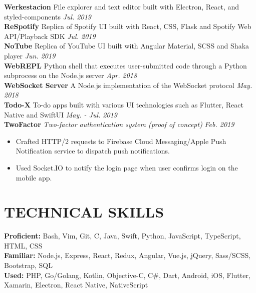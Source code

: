\documentclass[11pt]{article}
\begin{document}
\textbf{Werkestacion} \enspace File explorer and text editor built with Electron, React, and styled-components \hfill \textit{Jul. 2019}\\
\textbf{ReSpotify} \enspace Replica of Spotify UI built with React, CSS, Flask and Spotify Web API/Playback SDK \hfill\textit{Jul. 2019}\\
\textbf{NoTube} \enspace Replica of YouTube UI built with Angular Material, SCSS and Shaka player \hfill\textit{Jun. 2019}\\
%
\textbf{WebREPL}  \enspace Python shell that executes user-submitted code through a Python subprocess on the Node.js server \hfill\textit{Apr. 2018}\\
\textbf{WebSocket Server}  \enspace A Node.js implementation of the WebSocket protocol \hfill\textit{May. 2018}\\
\textbf{Todo-X} \enspace To-do apps built with various UI technologies such as Flutter, React Native and SwiftUI \hfill\textit{May. - Jul. 2019}\\
\textbf{TwoFactor} \enspace \textit{\color{gray} Two-factor authentication system (proof of concept)} \hfill \textit{Feb. 2019}
\begin{itemize}[leftmargin=15pt, noitemsep, topsep=0pt]
\item Crafted HTTP/2 requests to Firebase Cloud Messaging/Apple Push Notification service to dispatch push notifications.
\item Used Socket.IO to notify the login page when user confirms login on the mobile app.
\end{itemize}

\section*{TECHNICAL SKILLS}
\textbf{Proficient:} Bash, Vim, Git, C, Java, Swift, Python, JavaScript, TypeScript, HTML, CSS\\
\textbf{Familiar:} Node.js, Express, React, Redux, Angular, Vue.js, jQuery, Sass/SCSS, Bootstrap, SQL\\
\textbf{Used:} PHP, Go/Golang, Kotlin, Objective-C, C\#, Dart, Android, iOS, Flutter, Xamarin, Electron, React Native, NativeScript
\end{document}
